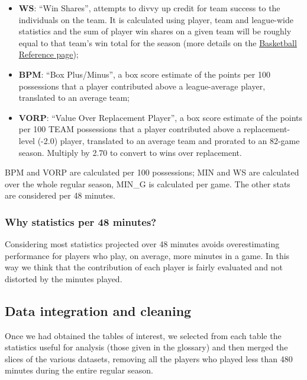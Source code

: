 \documentclass[
]{article}
\providecommand{\tightlist}{%
  \setlength{\itemsep}{0pt}\setlength{\parskip}{0pt}}
\begin{document}
\begin{itemize}
\tightlist
\item
  \textbf{WS}: ``Win Shares'', attempts to divvy up credit for team
  success to the individuals on the team. It is calculated using player,
  team and league-wide statistics and the sum of player win shares on a
  given team will be roughly equal to that team's win total for the
  season (more details on the
  \href{https://www.basketball-reference.com/about/ws.html}{Basketball
  Reference page});
\item
  \textbf{BPM}: ``Box Plus/Minus'', a box score estimate of the points
  per 100 possessions that a player contributed above a league-average
  player, translated to an average team;
\item
  \textbf{VORP}: ``Value Over Replacement Player'', a box score estimate
  of the points per 100 TEAM possessions that a player contributed above
  a replacement-level (-2.0) player, translated to an average team and
  prorated to an 82-game season. Multiply by 2.70 to convert to wins
  over replacement.
\end{itemize}

BPM and VORP are calculated per 100 possessions; MIN and WS are
calculated over the whole regular season, MIN\_G is calculated per game.
The other stats are considered per 48 minutes.

\hypertarget{why-statistics-per-48-minutes}{%
\subsubsection{Why statistics per 48
minutes?}\label{why-statistics-per-48-minutes}}

Considering most statistics projected over 48 minutes avoids
overestimating performance for players who play, on average, more
minutes in a game. In this way we think that the contribution of each
player is fairly evaluated and not distorted by the minutes played.

\hypertarget{data-integration-and-cleaning}{%
\subsection{Data integration and
cleaning}\label{data-integration-and-cleaning}}

Once we had obtained the tables of interest, we selected from each table
the statistics useful for analysis (those given in the glossary) and
then merged the slices of the various datasets, removing all the players
who played less than 480 minutes during the entire regular season.
\end{document}
